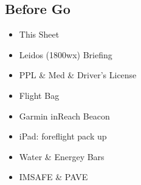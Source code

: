 \documentclass[10pt]{article}
\begin{document}
\begin{multicols*}{2}
\subsection{Before Go%
  \label{before-go}%
}

\begin{itemize}
\item This Sheet

\item Leidos (1800wx) Briefing

\item PPL \& Med \& Driver's License

\item Flight Bag

\item Garmin inReach Beacon

\item iPad: foreflight pack up

\item Water \& Energey Bars

\item \textquotedbl{}IMSAFE\textquotedbl{} \& \textquotedbl{}PAVE\textquotedbl{}
\end{itemize}

\end{multicols*}
\end{document}
